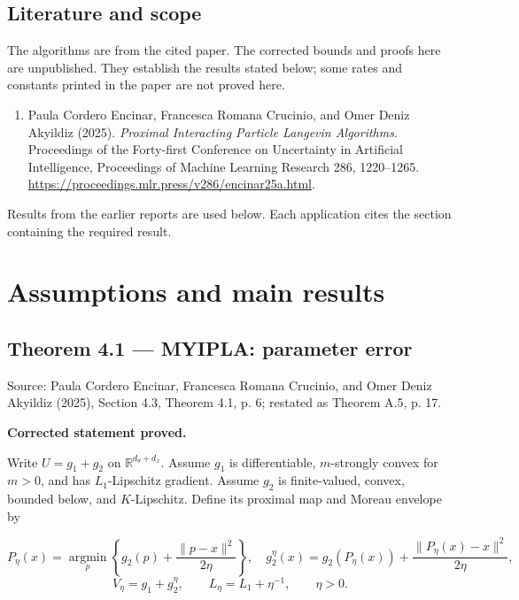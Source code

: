 \documentclass[11pt,a4paper]{report}
\begin{document}
\section*{Literature and scope}
The algorithms are from the cited paper. The corrected bounds and proofs here are unpublished. They establish the results stated below; some rates and constants printed in the paper are not proved here.

\begin{enumerate}
\item Paula Cordero Encinar, Francesca Romana Crucinio, and Omer Deniz Akyildiz (2025). \emph{Proximal Interacting Particle Langevin Algorithms}. Proceedings of the Forty-first Conference on Uncertainty in Artificial Intelligence, Proceedings of Machine Learning Research 286, 1220–1265. \url{https://proceedings.mlr.press/v286/encinar25a.html}.
\end{enumerate}
Results from the earlier reports \cite{LangevinLean2026ULASC,LangevinLean2026ULALSI,LangevinLean2026IPLA} are used below. Each application cites the section containing the required result.

\tableofcontents
\clearpage
{}
\chapter{Assumptions and main results}
\section{\texorpdfstring{Theorem 4.1 — MYIPLA: parameter error}{Theorem 4.1 — MYIPLA: parameter error}}


Source: Paula Cordero Encinar, Francesca Romana Crucinio, and Omer Deniz Akyildiz (2025), Section 4.3, Theorem 4.1, p. 6; restated as Theorem A.5, p. 17.



\textbf{Corrected statement proved.}



Write \(U=g_1+g_2\) on \(\mathbb R^{d_\theta+d_x}\). Assume \(g_1\) is differentiable, \(m\)-strongly convex for \(m>0\), and has \(L_1\)-Lipschitz gradient. Assume \(g_2\) is finite-valued, convex, bounded below, and \(K\)-Lipschitz. Define its proximal map and Moreau envelope by


\[P_\eta(x)=\operatorname*{argmin}_p\left\{g_2(p)+\frac{\|p-x\|^2}{2\eta}\right\},\quad
g_2^\eta(x)=g_2(P_\eta(x))+\frac{\|P_\eta(x)-x\|^2}{2\eta},\]
\[V_\eta=g_1+g_2^\eta,\qquad L_\eta=L_1+\eta^{-1},\qquad\eta>0.\]
\end{document}
